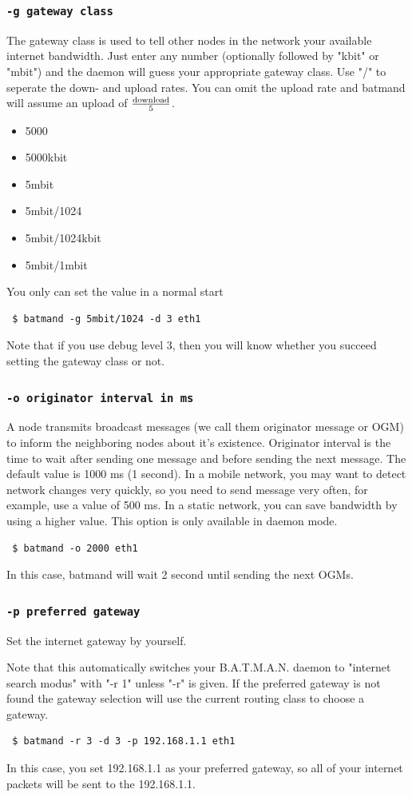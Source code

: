 \documentclass[
	12pt,
	a4paper,
	twoside,
	english,
	headsepline,
	footnosepline,
	automark,
	normalheadings,
	openany,
	cleardoubleplain,
	abstracton,
	idxtotoc,
	liststotoc,
	bibtotoc,
 	BCOR8mm,
]{scrartcl}
\newcommand{\subsubsectionttt}[1]{\subsubsection{\texttt{#1}}}
\begin{document}
\subsubsectionttt{-g gateway class}
The gateway class is used to tell other nodes in the network your available
internet bandwidth. Just enter any number (optionally followed by "kbit" or
"mbit") and the daemon will guess your appropriate gateway class. Use "/" to
seperate the down- and upload rates. You can omit the upload rate and batmand
will assume an upload of $\mathrm{download}\over{5}$.

\begin{itemize}
\item 5000
\item 5000kbit
\item 5mbit
\item 5mbit/1024
\item 5mbit/1024kbit
\item 5mbit/1mbit
\end{itemize}
You only can set the value in a normal start
\begin{verbatim}
 $ batmand -g 5mbit/1024 -d 3 eth1
\end{verbatim}
Note that if you use debug level 3, then you will know whether you succeed
setting the gateway class or not.

\subsubsectionttt{-o originator interval in ms}
A node transmits broadcast messages (we call them originator message or OGM) to
inform the neighboring nodes about it’s existence. Originator interval is the
time to wait after sending one message and before sending the next message.
The default value is 1000 ms (1 second). In a mobile network, you may want to
detect network changes very quickly, so you need to send message very often, for
example, use a value of 500 ms. In a static network, you can save bandwidth by
using a higher value. This option is only available in daemon mode.
\begin{verbatim}
 $ batmand -o 2000 eth1
\end{verbatim}
In this case, batmand will wait 2 second until sending the next OGMs.

\subsubsectionttt{-p preferred gateway}
Set the internet gateway by yourself. 

Note that this automatically switches your B.A.T.M.A.N. daemon to "internet
search modus" with "-r 1" unless "-r" is given. If the preferred gateway is not
found the gateway selection will use the current routing class to choose a
gateway.

\begin{verbatim}
 $ batmand -r 3 -d 3 -p 192.168.1.1 eth1
\end{verbatim}
In this case, you set 192.168.1.1 as your preferred gateway, so all of your
internet packets will be sent to the 192.168.1.1.
\end{document}

